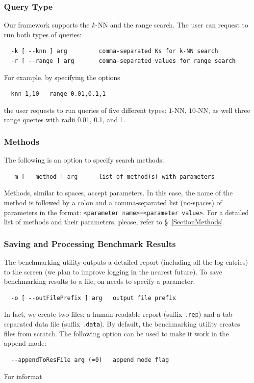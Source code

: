\documentclass[runningheads,a4paper]{llncs}
\newcommand{\ttt}[1]{\texttt{#1}}
\newcommand{\knn}{$k$-NN }
\begin{document}
{\subsubsection{Query Type} 
Our framework supports the \knn and the range search.
The user can request to run both types of queries:
\begin{verbatim}
  -k [ --knn ] arg         comma-separated Ks for k-NN search
  -r [ --range ] arg       comma-separated values for range search
\end{verbatim}
For example, by specifying the options 
\begin{verbatim}
--knn 1,10 --range 0.01,0.1,1
\end{verbatim}
the user requests to run queries of five different types: $1$-NN, $10$-NN,
as well three range queries with radii 0.01, 0.1, and 1.

\subsubsection{Methods}
The following is an option to specify search methods:
\begin{verbatim}
  -m [ --method ] arg      list of method(s) with parameters
\end{verbatim}
Methods, similar to spaces, accept parameters. 
In this case,
the name of the method is followed by a colon and a comma-separated list (no-spaces)
of parameters in the format:
\ttt{<parameter name>=<parameter value>}.
For a detailed list of methods and their parameters, please, refer to \S~\ref{SectionMethods}.

\subsubsection{Saving and Processing Benchmark Results}
The benchmarking utility outputs a detailed report (including all the log entries) to the screen
(we plan to improve logging in the nearest future).
To save benchmarking results to a file, on needs to specify a parameter:
\begin{verbatim}
  -o [ --outFilePrefix ] arg   output file prefix
\end{verbatim}
In fact, we create two files: a human-readable report (suffix \ttt{.rep}) and 
a tab-separated data file (suffix \ttt{.data}).
By default, the benchmarking utility creates files from scratch. The
following option can be used to make it work in the append mode:
\begin{verbatim}
  --appendToResFile arg (=0)   append mode flag
\end{verbatim}
For informat

}
\end{document}
